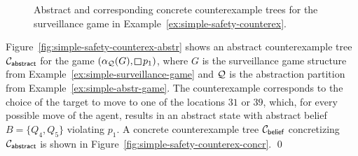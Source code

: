 \begin{figure}
\hfill
{}
\caption{Abstract and corresponding concrete counterexample trees for the surveillance game in Example~\ref{ex:simple-safety-counterex}.}
\label{fig:simple-safety-counterex}
\end{figure}

\begin{example}\label{ex:simple-safety-counterex}
Figure~\ref{fig:simple-safety-counterex-abstr} shows an abstract counterexample tree $\mathcal{C}_{\mathsf{abstract}}$ for the game $(\alpha_\part(G),\LTLglobally p_1)$, where $G$ is the surveillance game structure from Example~\ref{ex:simple-surveillance-game} and $\mathcal{Q}$ is the abstraction partition from Example~\ref{ex:simple-abstr-game}. The counterexample corresponds to the choice of the target to move to one of the locations $31$ or $39$, which, for every possible move of the agent, results in an abstract state with abstract belief $B = \{Q_4,Q_5\}$ violating $p_1$.
A concrete counterexample tree $\mathcal{C}_{\mathsf{belief}}$ concretizing $\mathcal{C}_{\mathsf{abstract}}$ is shown in Figure~\ref{fig:simple-safety-counterex-concr}.
\qed
\end{example}
